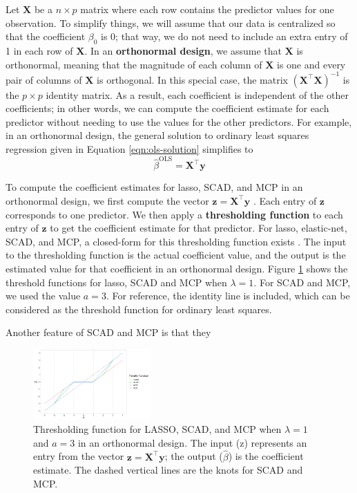 \documentclass{article}
\begin{document}
Let $\mathbf{X}$ be a $n\times p$ matrix where each row contains the predictor values for one observation. To simplify things, we will assume that our data is centralized so that the coefficient $\beta_0$ is 0; that way, we do not need to include an extra entry of 1 in each row of $\mathbf{X}$. In an \textbf{orthonormal design}, we assume that $\mathbf{X}$ is orthonormal, meaning that the magnitude of each column of $\mathbf{X}$ is one and every pair of columns of $\mathbf{X}$ is orthogonal. In this special case, the matrix $(\mathbf{X}^\top \mathbf{X})^{-1}$ is the $p\times p$ identity matrix. As a result, each coefficient is independent of the other coefficients; in other words, we can compute the coefficient estimate for each predictor without needing to use the values for the other predictors. For example, in an orthonormal design, the general solution to ordinary least squares regression given in Equation \ref{eqn:ols-solution} simplifies to
\begin{equation}\label{ols-orthonormal-solution}
	\hat{\beta}^{\text{OLS}} = \mathbf{X}^\top \mathbf{y}
\end{equation}

To compute the coefficient estimates for lasso, SCAD, and MCP in an orthonormal design, we first compute the vector $\mathbf{z} = \mathbf{X}^\top \mathbf{y}$ \cite{fan2001variable}. Each entry of $\mathbf{z}$ corresponds to one predictor. We then apply a \textbf{thresholding function} to each entry of $\mathbf{z}$ to get the coefficient estimate for that predictor. For lasso, elastic-net, SCAD, and MCP, a closed-form for this thresholding function exists \cite{tibshirani1996regression, fan2001variable, zou2005regularization, zhang2010nearly}. The input to the thresholding function is the actual coefficient value, and the output is the estimated value for that coefficient in an orthonormal design. Figure \ref{fig:prediction} shows the threshold functions for lasso, SCAD and MCP when $\lambda = 1$. For SCAD and MCP, we used the value $a = 3$. For reference, the identity line is included, which can be considered as the threshold function for ordinary least squares.

Another feature of SCAD and MCP is that they

\begin{figure}[!h]
	\centering
	\includegraphics[width = 0.4\textwidth]{images/lasso-scad-mcp-solution.png}
	\captionsetup{width = 4in}
	\caption{Thresholding function for LASSO, SCAD, and MCP when $\lambda = 1$ and $a = 3$ in an orthonormal design. The input (z) represents an entry from the vector $\mathbf{z}=\mathbf{X}^\top \mathbf{y}$; the output ($\hat{\beta}$) is the coefficient estimate. The dashed vertical lines are the knots for SCAD and MCP.}
	\label{fig:prediction}
\end{figure}
\end{document}
